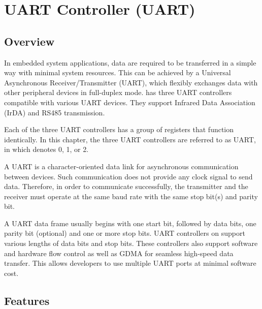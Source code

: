 \documentclass[main\_\_EN.tex]{subfiles}
\begin{document}

\ifglobal
\else
    {\let\clearpage\relax \listoftodos}
    \tableofcontents
\fi



\hypertarget{uart}{}
\chapter{UART Controller (UART)}
\label{mod:uart}


\section{Overview}

In embedded system applications, data are required to be transferred in a simple way with minimal system resources. This can be achieved by a Universal Asynchronous Receiver/Transmitter (UART), which flexibly exchanges data with other peripheral devices in full-duplex mode. \chipname{} has three UART controllers compatible with various UART devices. They support Infrared Data Association (IrDA) and RS485 transmission.

Each of the three UART controllers has a group of registers that function identically. In this chapter, the three UART controllers are referred to as UART, in which  denotes 0, 1, or 2.

A UART is a character-oriented data link for asynchronous communication between devices. Such communication does not provide any clock signal to send data. Therefore, in order to communicate successfully, the transmitter and the receiver must operate at the same baud rate with the same stop bit(s) and parity bit.

A UART data frame usually begins with one start bit, followed by data bits, one parity bit (optional) and one or more stop bits. UART controllers on \chipname{}  support various lengths of data bits and stop bits. These controllers also support software and hardware flow control as well as GDMA for seamless high-speed data transfer. This allows developers to use multiple UART ports at minimal software cost.

\section{Features}
\end{document}
